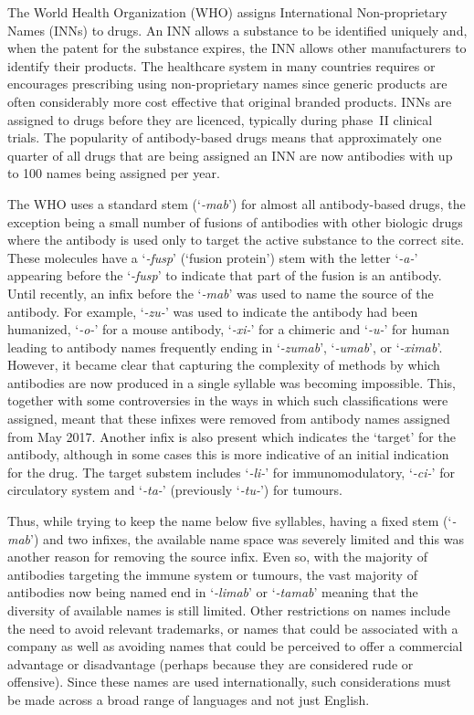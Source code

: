 \documentclass{article}
\newcommand{\eg}[1]{`\emph{#1}'}
\begin{document}
The World Health Organization (WHO) assigns International
Non-proprietary Names (INNs) to drugs. An INN allows a substance to be
identified uniquely and, when the patent for the substance expires,
the INN allows other manufacturers to identify their products. The
healthcare system in many countries requires or encourages prescribing
using non-proprietary names since generic products are often
considerably more cost effective that original branded products. INNs
are assigned to drugs before they are licenced, typically during
phase~II clinical trials. The popularity of antibody-based drugs means
that approximately one quarter of all drugs that are being assigned an
INN are now antibodies with up to 100 names being assigned per year.

The WHO uses a standard stem (\eg{-mab}) for almost all
antibody-based drugs, the exception being a small number of fusions of
antibodies with other biologic drugs where the antibody is used only
to target the active substance to the correct site. These molecules
have a \eg{-fusp} (`fusion protein') stem with the letter \eg{-a-}
appearing before the \eg{-fusp} to indicate that part of the fusion
is an antibody. Until recently, an infix before the \eg{-mab} was
used to name the source of the antibody. For example, \eg{-zu-} was
used to indicate the antibody had been humanized, \eg{-o-} for a
mouse antibody, \eg{-xi-} for a chimeric and \eg{-u-} for
human\cite{xxx} leading to antibody names frequently ending in
\eg{-zumab}, \eg{-umab}, or \eg{-ximab}. However, it became
clear that capturing the complexity of methods by which antibodies are
now produced in a single syllable was becoming impossible. This,
together with some controversies in the ways in which such
classifications were assigned, meant that these infixes were removed
from antibody names assigned from May 2017\cite{xxx}. Another infix is
also present which indicates the `target' for the antibody, although in
some cases this is more indicative of an initial indication for the
drug. The target substem includes \eg{-li-} for immunomodulatory,
\eg{-ci-} for circulatory system and \eg{-ta-} (previously
\eg{-tu-}) for tumours.

Thus, while trying to keep the name below five syllables, having a
fixed stem (\eg{-mab}) and two infixes, the available name space was
severely limited and this was another reason for removing the source
infix. Even so, with the majority of antibodies targeting the immune
system or tumours, the vast majority of antibodies now being named end
in \eg{-limab} or \eg{-tamab} meaning that the diversity of available
names is still limited. Other restrictions on names include the need
to avoid relevant trademarks, or names that could be associated with a
company as well as avoiding names that could be perceived to offer a
commercial advantage or disadvantage (perhaps because they are
considered rude or offensive). Since these names are used
internationally, such considerations must be made across a broad range
of languages and not just English.
\end{document}
